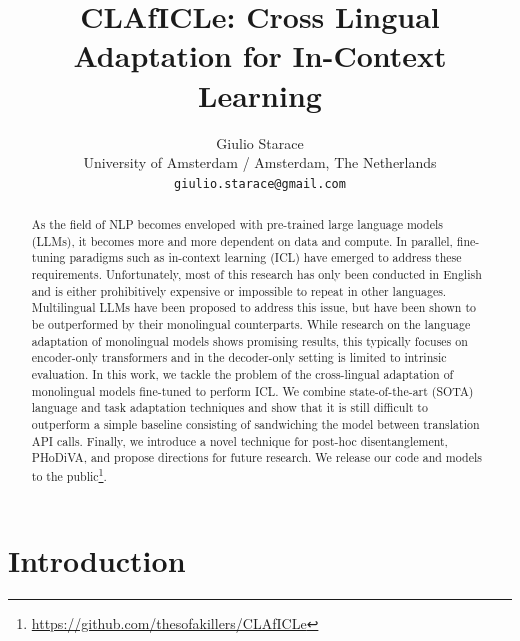\documentclass[11pt]{article}
\title{CLAfICLe: Cross Lingual Adaptation for In-Context Learning}
\author{Giulio Starace \\
  University of Amsterdam / Amsterdam, The Netherlands \\
  \texttt{giulio.starace@gmail.com} \\}
\begin{document}
\maketitle
\begin{abstract}

	As the field of NLP becomes enveloped with pre-trained large language models (LLMs), it becomes
	more and more dependent on data and compute. In parallel, fine-tuning paradigms such as in-context
	learning (ICL) have emerged to address these requirements. Unfortunately, most of this research
	has only been conducted in English and is either prohibitively expensive or impossible to repeat
	in other languages. Multilingual LLMs have been proposed to address this issue, but have been
	shown to be outperformed by their monolingual counterparts. While research on the language
	adaptation of monolingual models shows promising results, this typically focuses on encoder-only
	transformers and in the decoder-only setting is limited to intrinsic evaluation. In this work, we
	tackle the problem of the cross-lingual adaptation of monolingual models fine-tuned to perform
	ICL. We combine state-of-the-art (SOTA) language and task adaptation techniques and show that it
	is still difficult to outperform a simple baseline consisting of sandwiching the model between
	translation API calls. Finally, we introduce a novel technique for post-hoc disentanglement,
	PHoDiVA, and propose directions for future research. We release our code and
	models to the public\footnote{\href{https://github.com/thesofakillers/CLAfICLe}{https://github.com/thesofakillers/CLAfICLe}}.

\end{abstract}
\section{Introduction}
\end{document}
